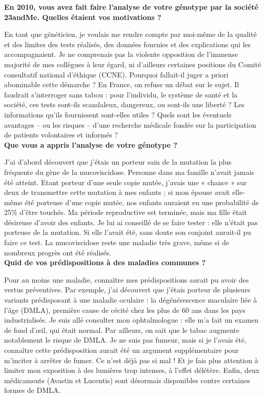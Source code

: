 \documentclass[8pt]{article}
\begin{document}
\textbf{En 2010, vous avez fait faire l’analyse de votre génotype par la société 23andMe. Quelles étaient vos motivations ?}

En tant que généticien, je voulais me rendre compte par moi-même de la qualité et des limites des tests réalisés, des données fournies et des explications qui les accompagnaient. Je ne comprenais pas la violente opposition de l’immense majorité de mes collègues à leur égard, ni d’ailleurs certaines positions du Comité consultatif national d’éthique (CCNE). Pourquoi fallait-il juger a priori abominable cette démarche ? En France, on refuse un débat sur le sujet. Il faudrait s’interroger sans tabou : pour l’individu, le système de santé et la société, ces tests sont-ils scandaleux, dangereux, ou sont-ils une liberté ? Les informations qu’ils fournissent sont-elles utiles ? Quels sont les éventuels avantages – ou les risques – d’une recherche médicale fondée sur la participation de patients volontaires et informés ?\\

\textbf{Que vous a appris l’analyse de votre génotype ?}

J’ai d’abord découvert que j’étais un porteur sain de la mutation la plus fréquente du gène de la mucoviscidose. Personne dans ma famille n’avait jamais été atteint. Etant porteur d’une seule copie mutée, j’avais une « chance » sur deux de transmettre cette mutation à mes enfants ; si mon épouse avait elle-même été porteuse d’une copie mutée, nos enfants auraient eu une probabilité de 25\% d’être touchés. Ma période reproductive est terminée, mais ma fille était désireuse d’avoir des enfants. Je lui ai conseillé de se faire tester : elle n’était pas porteuse de la mutation. Si elle l’avait été, sans doute son conjoint aurait-il pu faire ce test. La mucoviscidose reste une maladie très grave, même si de nombreux progrès ont été réalisés.\\

\textbf{Quid de vos prédispositions à des maladies communes ?}

Pour au moins une maladie, connaître mes prédispositions aurait pu avoir des vertus préventives. Par exemple, j’ai découvert que j’étais porteur de plusieurs variants prédisposant à une maladie oculaire : la dégénérescence maculaire liée à l’âge (DMLA), première cause de cécité chez les plus de 60 ans dans les pays industrialisés. Je suis allé consulter mon ophtalmologue : elle m’a fait un examen de fond d’œil, qui était normal. Par ailleurs, on sait que le tabac augmente notablement le risque de DMLA. Je ne suis pas fumeur, mais si je l’avais été, connaître cette prédisposition aurait été un argument supplémentaire pour m’inciter à arrêter de fumer. Ce n’est déjà pas si mal ! Et je fais plus attention à limiter mon exposition à des lumières trop intenses, à l’effet délétère. Enfin, deux médicaments (Avastin et Lucentis) sont désormais disponibles contre certaines formes de DMLA.\\
\end{document}
